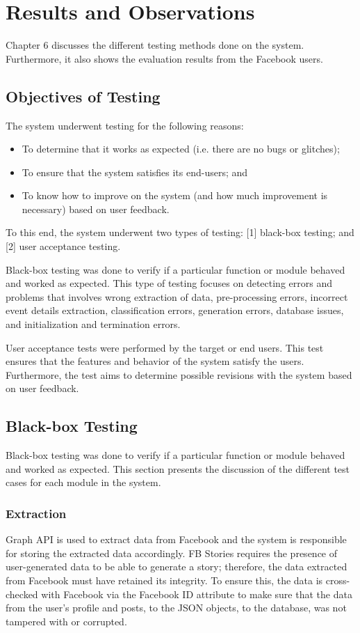 \chapter{Results and Observations}
\label{sec:resultsandobservations} 

Chapter 6 discusses the different testing methods done on the system. Furthermore, it also shows the evaluation results from the Facebook users.

\section{Objectives of Testing}
The system underwent testing for the following reasons:
\begin{itemize}
	\item To determine that it works as expected (i.e. there are no bugs or glitches);
	\item To ensure that the system satisfies its end-users; and
	\item To know how to improve on the system (and how much improvement is necessary) based on user feedback.
\end{itemize}

To this end, the system underwent two types of testing: [1] black-box testing; and [2] user acceptance testing. 

Black-box testing was done to verify if a particular function or module behaved and worked as expected. This type of testing focuses on detecting errors and problems that involves wrong extraction of data, pre-processing errors, incorrect event details extraction, classification errors, generation errors, database issues, and initialization and termination errors. 

User acceptance tests were performed by the target or end users. This test ensures that the features and behavior of the system satisfy the users. Furthermore, the test aims to determine possible revisions with the system based on user feedback.


\section{Black-box Testing}
Black-box testing was done to verify if a particular function or module behaved and worked as expected. This section presents the discussion of the different test cases for each module in the system.

\subsection{Extraction}
Graph API is used to extract data from Facebook and the system is responsible for storing the extracted data accordingly. FB Stories requires the presence of user-generated data to be able to generate a story; therefore, the data extracted from Facebook must have retained its integrity. To ensure this, the data is cross-checked with Facebook via the Facebook ID attribute to make sure that the data from the user's profile and posts, to the JSON objects, to the database, was not tampered with or corrupted.

